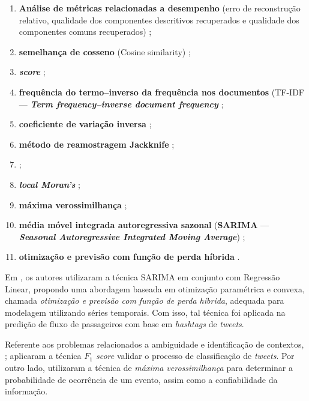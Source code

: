 \documentclass[
	12pt,				%
	oneside,			%
	a4paper,			%
	english,			%
	brazil				%
	]{abntex2ppgsi}
\begin{document}
{{{\begin{enumerate}
\item \textbf{Análise de métricas relacionadas a desempenho} (erro de reconstrução relativo, qualidade dos componentes descritivos recuperados e qualidade dos componentes comuns recuperados) \cite{Wen2016};
\item \textbf{semelhança de cosseno} (Cosine similarity) \cite{Yousaf2014, Frias-Martinez2014};
\item \textbf{\textit{ score}} \cite{Anantharam2015, Chen2016};
\item \textbf{frequência do termo–inverso da frequência nos documentos} (TF-IDF --- \textit{\textbf{Term frequency–inverse document frequency}} \cite{Mukherjee2015};
\item \textbf{coeficiente de variação inversa} \cite{Bendler2014};
\item \textbf{método de reamostragem Jackknife} \cite{Bendler2014};
\item {} \cite{Steiger2015Census};
\item \textit{\textbf{local Moran's}} \cite{Steiger2015Census};
\item \textbf{máxima verossimilhança} \cite{Mukherjee2015};
\item {} \textbf{média móvel integrada autoregressiva sazonal} (\textbf{SARIMA} --- {\textit{\textbf{Seasonal Autoregressive Integrated Moving Average}})} \cite{Ni2016};
\item \textbf{otimização e previsão com função de perda híbrida} \cite{Ni2016}.
\end{enumerate}
 
Em \cite{Ni2016}, os autores utilizaram a técnica SARIMA em conjunto com Regressão Linear, propondo uma abordagem baseada em otimização paramétrica e convexa, chamada \textit{otimização e previsão com função de perda híbrida}, adequada para modelagem utilizando séries temporais. Com isso, tal técnica foi aplicada na predição de fluxo de passageiros com base em \textit{hashtags} de \textit{tweets}.  

Referente aos problemas relacionados a ambiguidade e identificação de contextos, \cite{Anantharam2015}; \cite{Chen2016, Gal-Tzur2014} aplicaram a técnica \textit{${F_1}$ score} validar o processo de classificação de \textit{tweets}. Por outro lado, \cite{Mukherjee2015} utilizaram a técnica de \textit{máxima verossimilhança} para determinar a probabilidade de ocorrência de um evento, assim como a confiabilidade da informação.

}}}
\end{document}
